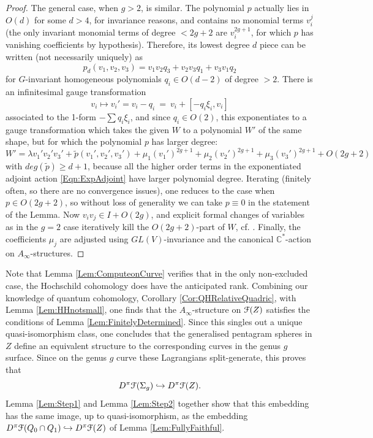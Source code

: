 \documentclass[reqno,10pt]{amsart}
\numberwithin{equation}{section}
\newcommand{\bC}{{\mathbb C}}
\newcommand{\scrF}{\EuScript{F}}
\theoremstyle{remark}
\begin{document}
\begin{proof}
The general case, when $g>2$, is similar. The polynomial $p$ actually lies in $O(d)$ for some $d>4$, for invariance reasons, and contains no monomial terms $v_i^j$ (the only invariant monomial terms of degree $<2g+2$ are $v_i^{2g+1}$, for which $p$  has vanishing coefficients by hypothesis).  Therefore, its lowest degree $d$ piece can be written (not necessarily uniquely) as
\[
p_d(v_1,v_2,v_3) = v_1v_2q_3 + v_2v_3q_1 + v_3v_1q_2
\]
for $G$-invariant homogeneous polynomials $q_i \in O(d-2)$ of degree $>2$.  There is an infinitesimal gauge transformation
\[
v_i \mapsto v_i' = v_i-q_i \ = \ v_i + [-q_i \xi_i, v_i]
\]
associated to the 1-form $-\sum q_i \xi_i$, and since $q_i \in O(2)$, this exponentiates to a gauge transformation which takes the given $W$ to a polynomial $W'$ of the same shape, but for which the polynomial $p$ has larger degree: 
\[
W' =  \lambda v_1'v_2'v_3'  + \tilde{p}(v_1',v_2', v_3') +  \mu_1 (v_1')^{2g+1} + \mu_2(v_2')^{2g+1} + \mu_3(v_3')^{2g+1} + O(2g+2) \] 
with  $deg(\tilde{p}) \geq d+1$, because all the higher order terms in the exponentiated adjoint action \eqref{Eqn:ExpAdjoint} have larger polynomial degree. Iterating (finitely often, so there are no convergence issues), one reduces to the case when $p \in O(2g+2)$, so without loss of generality we can take $p\equiv 0$ in the statement of the Lemma. Now $v_iv_j \in I + O(2g)$, and explicit formal changes of variables as in the $g=2$ case  iteratively kill the $O(2g+2)$-part of $W$, cf. \cite[Lemma 3.1]{Efimov}.  Finally, the coefficients $\mu_j$ are adjusted using $GL(V)$-invariance and the canonical $\bC^*$-action on $A_{\infty}$-structures.
\end{proof} 

Note that Lemma \ref{Lem:ComputeonCurve} verifies that in the only non-excluded case, the Hochschild cohomology does have the anticipated rank.   Combining our knowledge of quantum cohomology, Corollary \ref{Cor:QHRelativeQuadric}, with Lemma \ref{Lem:HHnotsmall}, one finds that the $A_{\infty}$-structure on $\scrF(Z)$ satisfies the conditions of Lemma \ref{Lem:FinitelyDetermined}.  Since this singles out a unique quasi-isomorphism class, one concludes that the generalised pentagram spheres in $Z$ define an equivalent structure to the corresponding curves in the genus $g$ surface.  Since on the genus $g$ curve these Lagrangians split-generate, this proves that
\[
D^{\pi}\scrF(\Sigma_g) \hookrightarrow D^{\pi}\scrF(Z).
\]
Lemma \ref{Lem:Step1} and Lemma \ref{Lem:Step2} together show that this embedding has the same image, up to quasi-isomorphism, as the embedding $D^{\pi}\scrF(Q_0 \cap Q_1) \hookrightarrow D^{\pi}\scrF(Z)$ of Lemma \ref{Lem:FullyFaithful}. 
\end{document}
